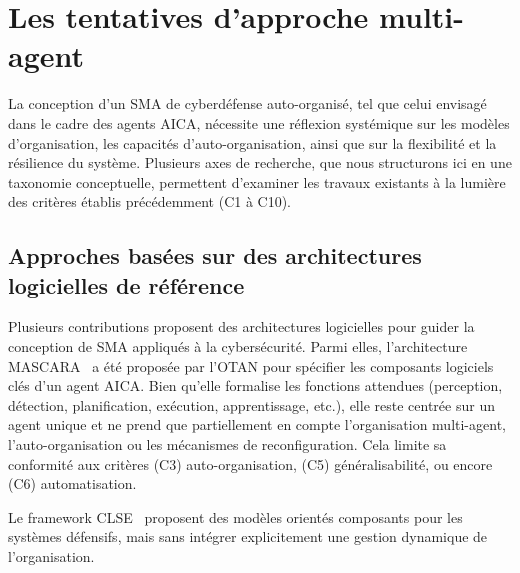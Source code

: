 \documentclass[ twoside,openright,titlepage,numbers=noenddot,headinclude,%
                footinclude=true,cleardoublepage=empty,abstractoff, %
                BCOR=5mm,paper=a4,fontsize=11pt,%
                french,american,%
                ]{scrreprt}
\begin{document}
\section{Les tentatives d'approche multi-agent}\label{sec:sma-conception-aica}

La conception d'un SMA de cyberdéfense auto-organisé, tel que celui envisagé dans le cadre des agents AICA, nécessite une réflexion systémique sur les modèles d'organisation, les capacités d'auto-organisation, ainsi que sur la flexibilité et la résilience du système. Plusieurs axes de recherche, que nous structurons ici en une taxonomie conceptuelle, permettent d'examiner les travaux existants à la lumière des critères établis précédemment (C1 à C10).

\subsection*{Approches basées sur des architectures logicielles de référence}

Plusieurs contributions proposent des architectures logicielles pour guider la conception de SMA appliqués à la cybersécurité. Parmi elles, l'architecture MASCARA~\cite{Kott2023} a été proposée par l'OTAN pour spécifier les composants logiciels clés d'un agent AICA. Bien qu'elle formalise les fonctions attendues (perception, détection, planification, exécution, apprentissage, etc.), elle reste centrée sur un agent unique et ne prend que partiellement en compte l'organisation multi-agent, l'auto-organisation ou les mécanismes de reconfiguration. Cela limite sa conformité aux critères (C3) auto-organisation, (C5) généralisabilité, ou encore (C6) automatisation.

Le framework CLSE~\cite{Hammar2023} proposent des modèles orientés composants pour les systèmes défensifs, mais sans intégrer explicitement une gestion dynamique de l'organisation.
\end{document}
